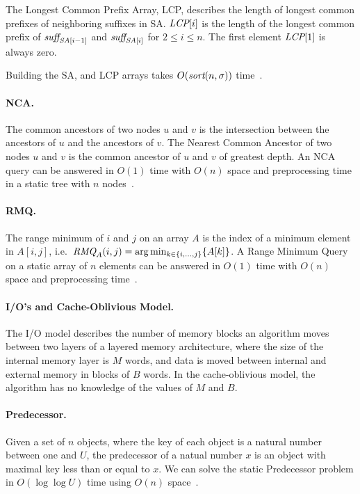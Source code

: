\documentclass[a4]{article}
\begin{document}
The Longest Common Prefix Array, LCP, describes the length of longest common prefixes of neighboring suffixes in SA. $\textit{LCP}[i]$ is the length of the longest common prefix of $\textit{suff}_{\textit{SA}[i-1]}$ and $\textit{suff}_{\textit{SA}[i]}$ for $2 \leq i \leq n$. The first element $\textit{LCP}[1]$ is always zero.

Building the SA, \SAi and LCP arrays takes $O(\textit{sort}(n,\sigma))$ time~\cite{sort-complexity}.

\paragraph{NCA.} The common ancestors of two nodes $u$ and $v$ is the intersection between the ancestors of $u$ and the ancestors of $v$. The Nearest Common Ancestor of two nodes $u$ and $v$ is the common ancestor of $u$ and $v$ of greatest depth. An NCA query can be answered in $O(1)$ time with $O(n)$ space and preprocessing time in a static tree with $n$ nodes~\cite{nca}.

\paragraph{RMQ.} The range minimum of $i$ and $j$ on an array $A$ is the index of a minimum element in $A[i,j]$, i.e.\ $\textit{RMQ}_A(i,j) = \arg \min_{k\in\{i,...,j\}}\{A[k]\}$. A Range Minimum Query on a static array of $n$ elements can be answered in $O(1)$ time with $O(n)$ space and preprocessing time~\cite{jf-rmq}.

\ifreport

\paragraph{I/O's and Cache-Oblivious Model.}
The I/O model describes the number of memory blocks an algorithm moves between two layers of a layered memory architecture, where the size of the internal memory layer is $M$ words, and data is moved between internal and external memory in blocks of $B$ words. In the cache-oblivious model, the algorithm has no knowledge of the values of $M$ and $B$.

\paragraph{Predecessor.}
Given a set of $n$ objects, where the key of each object is a natural number between one and $U$, the predecessor of a natual number $x$ is an object with maximal key less than or equal to $x$. We can solve the static Predecessor problem in $O(\log\log U)$ time using $O(n)$ space~\cite{predecessor}.
\end{document}
